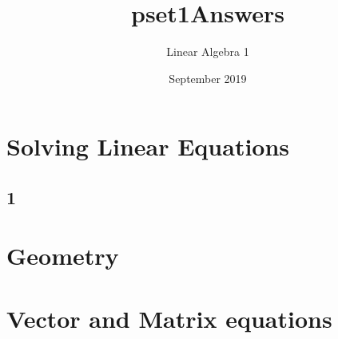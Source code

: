 \documentclass{article}
\title{pset1Answers}
\author{Linear Algebra 1}
\date{September 2019}
\begin{document}
\maketitle

\section{Solving Linear Equations}
\subsection*{1}
\begin{enumerate*}
    \item 
\end{enumerate*}




\section{Geometry}



\section{Vector and Matrix equations}
\end{document}
